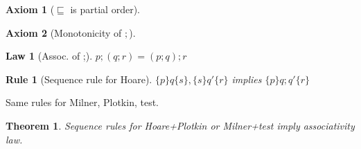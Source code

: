 \documentclass{article}
\begin{document}
\newcommand{\refines}{\sqsubseteq}

\newtheorem{axiom}{Axiom}
\newtheorem{law}{Law}
\newtheorem{rul}{Rule}
\newtheorem{theorem}{Theorem}


\begin{axiom} [$\refines$ is partial order]
\end{axiom}

\begin{axiom} [Monotonicity of $;$]
\end{axiom}


\begin{law}[Assoc. of ;]
$p;(q;r) = (p;q);r$
\end{law}

\begin{rul}[Sequence rule for Hoare]
$\{p\}q\{s\}, \{s\}q'\{r\}$ implies $\{p\}q;q'\{r\}$
\end{rul}

Same rules for Milner, Plotkin, test.

\begin{theorem}
Sequence rules for Hoare+Plotkin or Milner+test imply associativity law.
\end{theorem}
\end{document}
